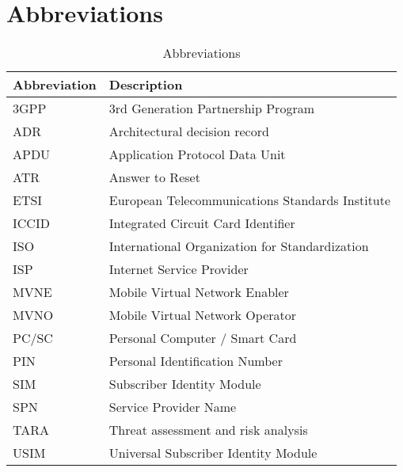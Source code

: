 
\chapter*{Abbreviations}

\begin{table}[ht!]
    \centering
    \caption{Abbreviations}
    \label{tab:abbreviations}
    \begin{tabular}{|l|l|}
        \hline
        \rowcolor{lightgray}
        \textbf{Abbreviation} & \textbf{Description}            \\ \hline
        3GPP  & 3rd Generation Partnership Program              \\ \hline
        ADR   & Architectural decision record                   \\ \hline
        APDU  & Application Protocol Data Unit                  \\ \hline
        ATR   & Answer to Reset                                 \\ \hline
        ETSI  & European Telecommunications Standards Institute \\ \hline
        ICCID & Integrated Circuit Card Identifier              \\ \hline
        ISO   & International Organization for Standardization  \\ \hline
        ISP   & Internet Service Provider                       \\ \hline
        MVNE  & Mobile Virtual Network Enabler                  \\ \hline
        MVNO  & Mobile Virtual Network Operator                 \\ \hline
        PC/SC & Personal Computer / Smart Card                  \\ \hline
        PIN   & Personal Identification Number                  \\ \hline
        SIM   & Subscriber Identity Module                      \\ \hline
        SPN   & Service Provider Name                           \\ \hline
        TARA  & Threat assessment and risk analysis             \\ \hline
        USIM  & Universal Subscriber Identity Module            \\ \hline
    \end{tabular}
\end{table}
